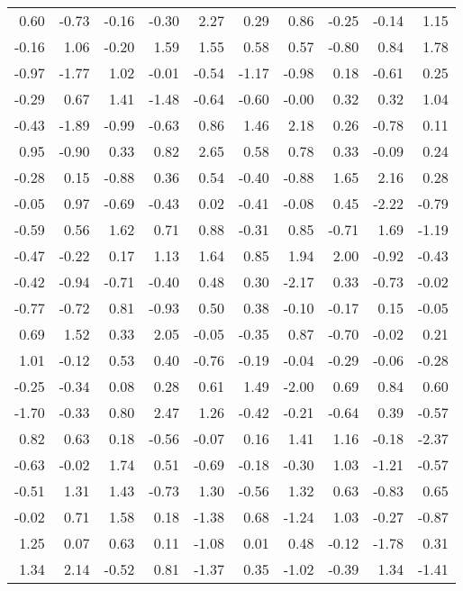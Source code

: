 \documentclass{article}\usepackage[]{graphicx}\usepackage[]{color}
\begin{document}
\begin{longtable}{rrrrrrrrrr}
  0.60 & -0.73 & -0.16 & -0.30 & 2.27 & 0.29 & 0.86 & -0.25 & -0.14 & 1.15 \\ 
  -0.16 & 1.06 & -0.20 & 1.59 & 1.55 & 0.58 & 0.57 & -0.80 & 0.84 & 1.78 \\ 
  -0.97 & -1.77 & 1.02 & -0.01 & -0.54 & -1.17 & -0.98 & 0.18 & -0.61 & 0.25 \\ 
  -0.29 & 0.67 & 1.41 & -1.48 & -0.64 & -0.60 & -0.00 & 0.32 & 0.32 & 1.04 \\ 
  -0.43 & -1.89 & -0.99 & -0.63 & 0.86 & 1.46 & 2.18 & 0.26 & -0.78 & 0.11 \\ 
  0.95 & -0.90 & 0.33 & 0.82 & 2.65 & 0.58 & 0.78 & 0.33 & -0.09 & 0.24 \\ 
  -0.28 & 0.15 & -0.88 & 0.36 & 0.54 & -0.40 & -0.88 & 1.65 & 2.16 & 0.28 \\ 
  -0.05 & 0.97 & -0.69 & -0.43 & 0.02 & -0.41 & -0.08 & 0.45 & -2.22 & -0.79 \\ 
  -0.59 & 0.56 & 1.62 & 0.71 & 0.88 & -0.31 & 0.85 & -0.71 & 1.69 & -1.19 \\ 
  -0.47 & -0.22 & 0.17 & 1.13 & 1.64 & 0.85 & 1.94 & 2.00 & -0.92 & -0.43 \\ 
  -0.42 & -0.94 & -0.71 & -0.40 & 0.48 & 0.30 & -2.17 & 0.33 & -0.73 & -0.02 \\ 
  -0.77 & -0.72 & 0.81 & -0.93 & 0.50 & 0.38 & -0.10 & -0.17 & 0.15 & -0.05 \\ 
  0.69 & 1.52 & 0.33 & 2.05 & -0.05 & -0.35 & 0.87 & -0.70 & -0.02 & 0.21 \\ 
  1.01 & -0.12 & 0.53 & 0.40 & -0.76 & -0.19 & -0.04 & -0.29 & -0.06 & -0.28 \\ 
  -0.25 & -0.34 & 0.08 & 0.28 & 0.61 & 1.49 & -2.00 & 0.69 & 0.84 & 0.60 \\ 
  -1.70 & -0.33 & 0.80 & 2.47 & 1.26 & -0.42 & -0.21 & -0.64 & 0.39 & -0.57 \\ 
  0.82 & 0.63 & 0.18 & -0.56 & -0.07 & 0.16 & 1.41 & 1.16 & -0.18 & -2.37 \\ 
  -0.63 & -0.02 & 1.74 & 0.51 & -0.69 & -0.18 & -0.30 & 1.03 & -1.21 & -0.57 \\ 
  -0.51 & 1.31 & 1.43 & -0.73 & 1.30 & -0.56 & 1.32 & 0.63 & -0.83 & 0.65 \\ 
  -0.02 & 0.71 & 1.58 & 0.18 & -1.38 & 0.68 & -1.24 & 1.03 & -0.27 & -0.87 \\ 
  1.25 & 0.07 & 0.63 & 0.11 & -1.08 & 0.01 & 0.48 & -0.12 & -1.78 & 0.31 \\ 
  1.34 & 2.14 & -0.52 & 0.81 & -1.37 & 0.35 & -1.02 & -0.39 & 1.34 & -1.41 \\ 

\end{longtable}
\end{document}

